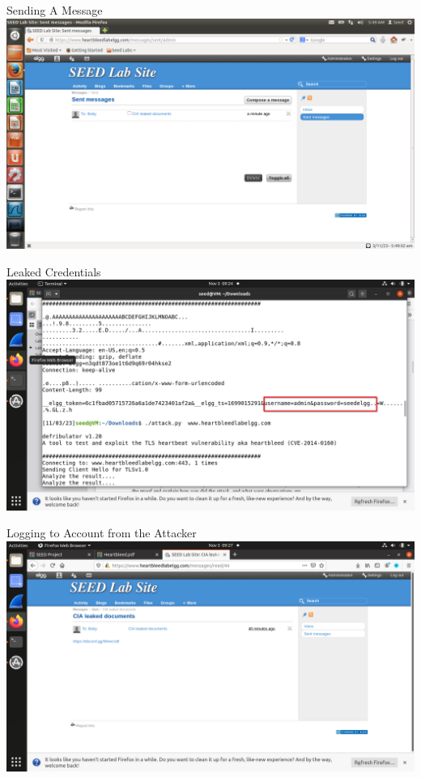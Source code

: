 \documentclass{beamer}
\begin{document}
\begin{frame}{Sending A Message}
    \includegraphics[width=\textwidth]{sent_message.png}
\end{frame}

\begin{frame}{Leaked Credentials}
    \includegraphics[width=\textwidth]{leaked_credentials.png}
\end{frame}

\begin{frame}{Logging to Account from the Attacker}
    \includegraphics[width=\textwidth]{attacker_sent_message.png}
\end{frame}
\end{document}
